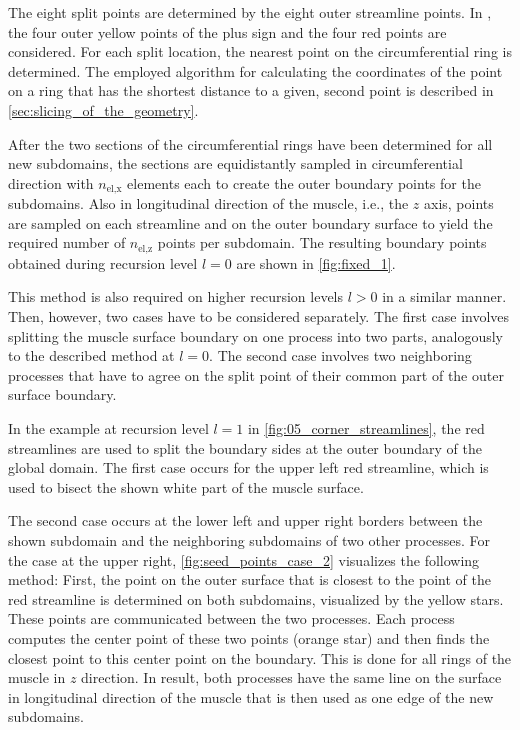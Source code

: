 The eight split points are determined by the eight outer streamline points. In , the four outer yellow points of the plus sign and the four red points are considered. For each split location, the nearest point on the circumferential ring is determined. The employed algorithm for calculating the coordinates of the point on a ring that has the shortest distance to a given, second point is described in \cref{sec:slicing_of_the_geometry}.

After the two sections of the circumferential rings have been determined for all new subdomains, the sections are equidistantly sampled in circumferential direction with $n_\text{el,x}$ elements each to create the outer boundary points for the subdomains. 
Also in longitudinal direction of the muscle, i.e., the $z$ axis, points are sampled on each streamline and on the outer boundary surface to yield the required number of $n_\text{el,z}$ points per subdomain. The resulting boundary points obtained during recursion level $l=0$ are shown in \cref{fig:fixed_1}.

This method is also required on higher recursion levels $l>0$ in a similar manner. 
Then, however, two cases have to be considered separately. The first case involves splitting the muscle surface boundary on one process into two parts, analogously to the described method at $l=0$. The second case involves two neighboring processes that have to agree on the split point of their common part of the outer surface boundary.

In the example at recursion level $l=1$ in \cref{fig:05_corner_streamlines}, the red streamlines are used to split the boundary sides at the outer boundary of the global domain. 
The first case occurs for the upper left red streamline, which is used to bisect the shown white part of the muscle surface. 

The second case occurs at the lower left and upper right borders between the shown subdomain and the neighboring subdomains of two other processes. For the case at the upper right, \cref{fig:seed_points_case_2} visualizes the following method: First, the point on the outer surface that is closest to the point of the red streamline is determined on both subdomains, visualized by the yellow stars. These points are communicated between the two processes. Each process computes the center point of these two points (orange star) and then finds the closest point to this center point on the boundary. This is done for all rings of the muscle in $z$ direction. In result, both processes have the same line on the surface in longitudinal direction of the muscle that is then used as one edge of the new subdomains.

